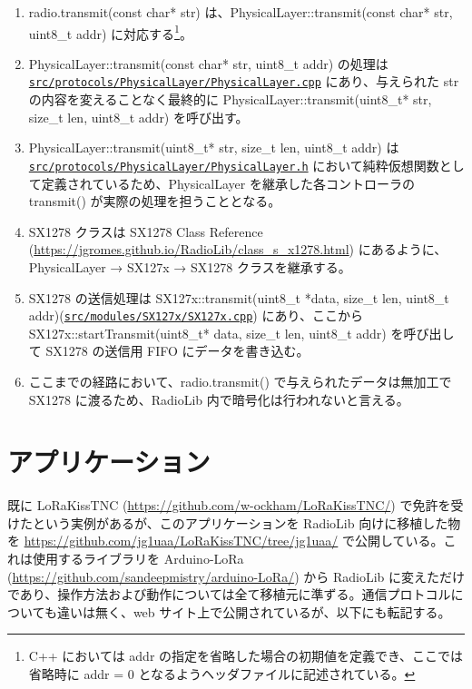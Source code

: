 \documentclass[a4j,oneside]{ujbook}
\begin{document}
\begin{enumerate}
 \item radio.transmit(const char* str) は、PhysicalLayer::transmit(const char* str, uint8\_t addr) に対応する\footnote{C++ においては addr の指定を省略した場合の初期値を定義でき、ここでは省略時に addr = 0 となるようヘッダファイルに記述されている。}。
 \item PhysicalLayer::transmit(const char* str, uint8\_t addr) の処理は\newline\href{https://github.com/jgromes/RadioLib/blob/master/src/protocols/PhysicalLayer/PhysicalLayer.cpp}{\tt{src/protocols/PhysicalLayer/PhysicalLayer.cpp}} にあり、\newline 与えられた str の内容を変えることなく最終的に PhysicalLayer::transmit(uint8\_t* str, size\_t len, uint8\_t addr) を呼び出す。
 \item PhysicalLayer::transmit(uint8\_t* str, size\_t len, uint8\_t addr) は\newline\href{https://github.com/jgromes/RadioLib/blob/master/src/protocols/PhysicalLayer/PhysicalLayer.h}{\tt{src/protocols/PhysicalLayer/PhysicalLayer.h}} において純粋仮想関数として定義されているため、PhysicalLayer を継承した各コントローラの transmit() が実際の処理を担うこととなる。
 \item SX1278 クラスは SX1278 Class Reference (\url{https://jgromes.github.io/RadioLib/class_s_x1278.html}) にあるように、PhysicalLayer → SX127x → SX1278 クラスを継承する。
 \item SX1278 の送信処理は SX127x::transmit(uint8\_t *data, size\_t len, uint8\_t addr)\newline(\href{https://github.com/jgromes/RadioLib/blob/master/src/modules/SX127x/SX127x.cpp}{\tt{src/modules/SX127x/SX127x.cpp}}) にあり、ここから SX127x::startTransmit(uint8\_t* data, size\_t len, uint8\_t addr) を呼び出して SX1278 の送信用 FIFO にデータを書き込む。
 \item ここまでの経路において、radio.transmit() で与えられたデータは無加工で SX1278 に渡るため、RadioLib 内で暗号化は行われないと言える。
\end{enumerate}

\section*{アプリケーション}

既に LoRaKissTNC (\url{https://github.com/w-ockham/LoRaKissTNC/}) で免許を受けたという実例があるが、このアプリケーションを RadioLib 向けに移植した物を \url{https://github.com/jg1uaa/LoRaKissTNC/tree/jg1uaa/} で公開している。これは使用するライブラリを Arduino-LoRa (\url{https://github.com/sandeepmistry/arduino-LoRa/}) から RadioLib に変えただけであり、操作方法および動作については全て移植元に準ずる。通信プロトコルについても違いは無く、web サイト上で公開されているが、以下にも転記する。
\end{document}
